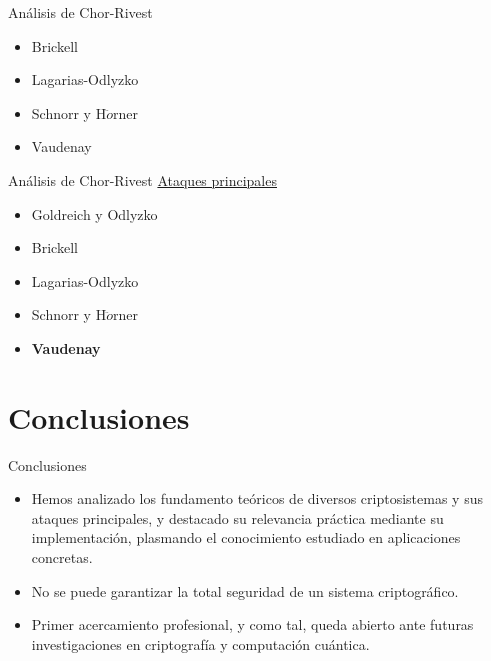 \documentclass{beamer}
\begin{document}
\begin{frame}{Análisis de Chor-Rivest}
\begin{center}
\begin{itemize}[left=120pt]
                  \item Brickell
                    \item Lagarias-Odlyzko
                    \item Schnorr y H$\ddot{o}$rner
                    \item Vaudenay
                \end{itemize}
            \end{center}
        \end{frame}

        \begin{frame}{Análisis de Chor-Rivest}
            \centering
            \uline{Ataques principales}
            \vspace{0.5cm}
            \begin{itemize}[left=120pt]
                \item Goldreich y Odlyzko
                \item Brickell
                \item Lagarias-Odlyzko
                \item Schnorr y H$\ddot{o}$rner
                \item \textbf{Vaudenay}
            \end{itemize}
        \end{frame}

    \section{Conclusiones}

        \begin{frame}{Conclusiones}
            \begin{itemize}
                \item Hemos analizado los fundamento teóricos de diversos criptosistemas y sus ataques principales, y destacado su relevancia práctica mediante su implementación, plasmando el conocimiento estudiado en aplicaciones concretas.
                \item No se puede garantizar la total seguridad de un sistema criptográfico.
                \item Primer acercamiento profesional, y como tal, queda abierto ante futuras investigaciones en criptografía y computación cuántica.
            \end{itemize}
        \end{frame}
\end{document}

